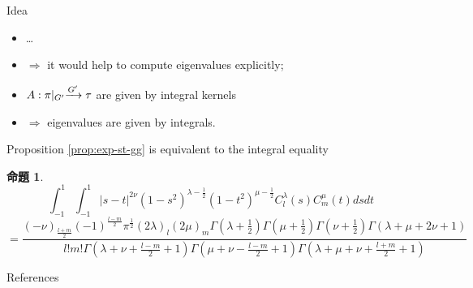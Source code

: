 \documentclass[pdf,notes]{beamer}
\renewcommand{\implies}{\Rightarrow}
\newtheorem{prop}{命題}
\begin{document}
\begin{frame}{Idea}
	\begin{itemize}%
		\item \ldots
		\item $\implies$ it would help to compute eigenvalues explicitly;
		\item $\mysbo$ are given by integral kernels 
		\item $\implies$ eigenvalues are given by integrals.
	\end{itemize}
\end{frame}
\begin{frame}
	Proposition \ref{prop:exp-st-gg} is equivalent to the integral equality
	\begin{prop}
		\label{prop:int-st-gg}
		\begin{equation*}
			\int_{- 1}^1 \int_{- 1}^1 | s - t |^{2 \nu} (1 - s^2)^{\lambda - \frac{1}{2}}
			(1 - t^2)^{\mu - \frac{1}{2}} C_l^{\lambda} (s) C_m^{\mu} (t) d s d t
		\end{equation*}
		{\scriptsize
		\begin{equation}
			=\frac{(- \nu)_{\frac{l + m}{2}} (- 1)^{\frac{l - m}{2}} \pi^{\frac{1}{2}} (2
			\lambda)_l (2 \mu)_m \Gamma \left( \lambda + \frac{1}{2} \right) \Gamma \left(
			\mu + \frac{1}{2} \right) \Gamma \left( \nu + \frac{1}{2} \right) \Gamma
		(\lambda + \mu + 2 \nu + 1)}{l!m! \Gamma \left( \lambda + \nu + \frac{l -
		m}{2} + 1 \right) \Gamma \left( \mu + \nu - \frac{l - m}{2} + 1 \right) \Gamma
		\left( \lambda + \mu + \nu + \frac{l + m}{2} + 1 \right)}
			\label{eqn:int-st-gg}
			\tag{1$'$}
		\end{equation}
		}
	\end{prop}
\end{frame}
\begin{frame}[allowframebreaks]{References}
	
	\nocite{Selberg:411367}
	\nocite{warnaar2010sl3}
	\nocite{dotsenko1985four}
	\nocite{tarasov2003selberg}

\end{frame}
\end{document}
